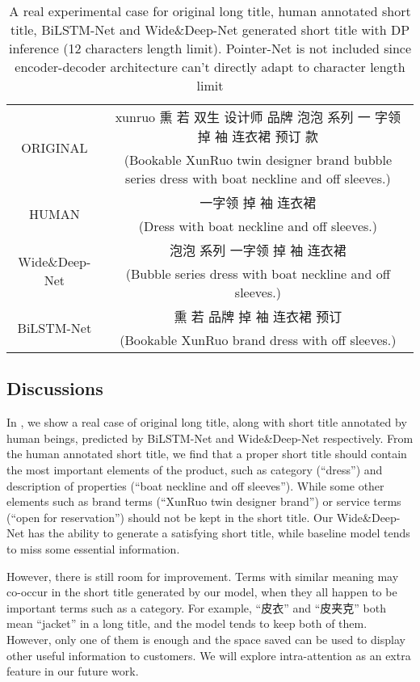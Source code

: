 \begin{table*}[ht]
	\centering
	\caption{A real experimental case for original long title,
		human annotated short title,
		BiLSTM-Net and Wide\&Deep-Net generated short title with DP inference (12 characters length limit). 
		Pointer-Net is not included since encoder-decoder architecture can't directly adapt to character length limit}
	\label{tab:case_study}
	\begin{tabular}{c|c}
		\toprule
		\multirow{2}{*}{ORIGINAL} & xunruo 熏 若 双生 设计师 品牌 泡泡 系列 一 字领 掉 袖 连衣裙 预订 款  \\
		& (Bookable XunRuo twin designer brand bubble series dress with boat neckline and off sleeves.) \\ 
		\midrule
		\multirow{2}{*}{HUMAN} & 一字领 掉 袖 连衣裙 \\
		& (Dress with boat neckline and off sleeves.) \\
		\midrule
		\multirow{2}{*}{Wide\&Deep-Net} & 泡泡 系列 一字领 掉 袖 连衣裙 \\
		& (Bubble series dress with boat neckline and off sleeves.) \\
		\midrule
		\multirow{2}{*}{BiLSTM-Net} & 熏 若 品牌 掉 袖 连衣裙 预订\\
		& (Bookable XunRuo brand dress with off sleeves.) \\
		\bottomrule
	\end{tabular}
\end{table*}


\subsection{Discussions}
In , we show a real case of original long title, 
along with short title annotated by human beings, 
predicted by BiLSTM-Net and Wide\&Deep-Net respectively.
From the human annotated short title,
we find that a proper short title should contain 
the most important elements of the product,
such as category (``dress'') and description of properties (``boat neckline and off sleeves'').
While some other elements such as 
brand terms (``XunRuo twin designer brand'')
or service terms (``open for reservation'') 
should not be kept in the short title.
Our Wide\&Deep-Net has the ability to generate
a satisfying short title,
while baseline model tends to miss some essential information.

However, there is still room for improvement.
Terms with similar meaning may co-occur
in the short title generated by our model,
when they all happen to be important terms such as a category.
For example, 
``皮衣'' and ``皮夹克'' both mean ``jacket'' in a long title,
and the model tends to keep both of them.
However, only one of them is enough and
the space saved can be used to display other useful information to customers.
We will explore intra-attention \cite{paulus2017deep} as an extra feature in our future work.

